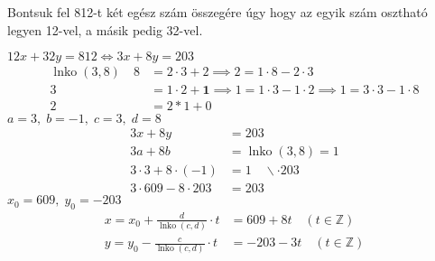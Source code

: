 \documentclass[a4paper,12pt]{article}
\DeclareMathOperator{\lnko}{lnko}
\theoremstyle{definition}
\begin{document}
	\newpage
	\begin{question}
		Bontsuk fel 812-t két egész szám összegére úgy hogy az egyik szám osztható legyen 12-vel, a másik pedig 32-vel.
	\end{question}
	\begin{solution}
		$12x + 32y = 812 \iff 3x + 8y = 203 $
		\begin{align*}
			\lnko{(3,8)} \quad  8 &= 2 \cdot 3 + 2 \implies 2 = 1 \cdot 8 - 2 \cdot 3 \\
			3 &= 1 \cdot 2 + \mathbf{1} \implies 1 = 1 \cdot 3 - 1 \cdot 2 \implies 1 = 3 \cdot 3 - 1 \cdot 8 \\
			2 &= 2 * 1 + 0
		\end{align*}
		$ a = 3, \; b = -1, \; c = 3, \; d = 8 $
		\begin{align*}
			3x + 8y &= 203 \\
			3a + 8b &= \lnko(3,8) = 1 \\
			3 \cdot 3 + 8 \cdot (-1) &= 1 \quad \backslash \cdot 203 \\
			3 \cdot 609 - 8 \cdot 203 &= 203
		\end{align*}
		$ x_0 = 609, \; y_0 = -203 $
		\begin{align*}
			x = x_0 + \frac{d}{\lnko{(c,d)}} \cdot t &= 609 + 8t \quad (t \in \mathbb{Z}) \\
			y = y_0 - \frac{c}{\lnko{(c,d)}} \cdot t &= -203 - 3t \quad (t \in \mathbb{Z})
		\end{align*}
	\end{solution}
	\newpage
\end{document}
